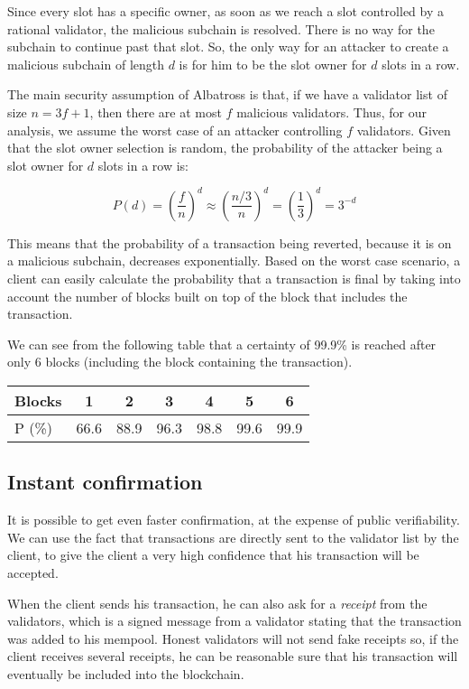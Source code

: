 \documentclass[conference]{IEEEtran}
\begin{document}
Since every slot has a specific owner, as soon as we reach a slot controlled by a rational validator, the malicious subchain is resolved. There is no way for the subchain to continue past that slot. So, the only way for an attacker to create a malicious subchain of length $d$ is for him to be the slot owner for $d$ slots in a row.

The main security assumption of Albatross is that, if we have a validator list of size $n=3f+1$, then there are at most $f$ malicious validators. Thus, for our analysis, we assume the worst case of an attacker controlling $f$ validators. Given that the slot owner selection is random, the probability of the attacker being a slot owner for $d$ slots in a row is:

\[ P(d)=\left( \frac{f}{n} \right)^d \approx \left( \frac{n/3}{n} \right)^d=\left( \frac{1}{3} \right)^d=3^{-d} \]

This means that the probability of a transaction being reverted, because it is on a malicious subchain, decreases exponentially. Based on the worst case scenario, a client can easily calculate the probability that a transaction is final by taking into account the number of blocks built on top of the block that includes the transaction.

We can see from the following table that a certainty of 99.9\% is reached after only 6 blocks (including the block containing the transaction).

\begin{center}
	\begin{tabular}[c]{l||c|c|c|c|c|c}
		Blocks & 1 & 2 & 3 & 4 & 5 & 6 \\
		\hline
		P (\%) & 66.6 & 88.9 & 96.3 & 98.8 & 99.6 & 99.9 \\
	\end{tabular}
\end{center}

\subsection{Instant confirmation} \label{instant-conf}
It is possible to get even faster confirmation, at the expense of public verifiability. We can use the fact that transactions are directly sent to the validator list by the client, to give the client a very high confidence that his transaction will be accepted.

When the client sends his transaction, he can also ask for a \textit{receipt} from the validators, which is a signed message from a validator stating that the transaction was added to his mempool. Honest validators will not send fake receipts so, if the client receives several receipts, he can be reasonable sure that his transaction will eventually be included into the blockchain.
\end{document}
